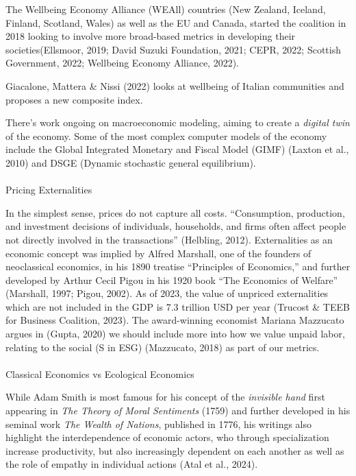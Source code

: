 \documentclass[
  letterpaper,
  DIV=11,
  numbers=noendperiod]{scrartcl}
\makeatletter
\let\oldparagraph\paragraph
\renewcommand{\paragraph}{
    \@ifstar
      \xxxParagraphStar
      \xxxParagraphNoStar
  }
\newcommand{\xxxParagraphStar}[1]{\oldparagraph*{#1}\mbox{}}
\newcommand{\xxxParagraphNoStar}[1]{\oldparagraph{#1}\mbox{}}
\makeatother
\begin{document}
The Wellbeing Economy Alliance (WEAll) countries (New Zealand, Iceland,
Finland, Scotland, Wales) as well as the EU and Canada, started the
coalition in 2018 looking to involve more broad-based metrics in
developing their societies(Ellsmoor, 2019; David Suzuki Foundation,
2021; CEPR, 2022; Scottish Government, 2022; Wellbeing Economy Alliance,
2022).

Giacalone, Mattera \& Nissi (2022) looks at wellbeing of Italian
communities and proposes a new composite index.

There's work ongoing on macroeconomic modeling, aiming to create a
\emph{digital twin} of the economy. Some of the most complex computer
models of the economy include the Global Integrated Monetary and Fiscal
Model (GIMF) (Laxton et al., 2010) and DSGE (Dynamic stochastic general
equilibrium).

\paragraph{Pricing Externalities}\label{pricing-externalities}

In the simplest sense, prices do not capture all costs. ``Consumption,
production, and investment decisions of individuals, households, and
firms often affect people not directly involved in the transactions''
(Helbling, 2012). Externalities as an economic concept was implied by
Alfred Marshall, one of the founders of neoclassical economics, in his
1890 treatise ``Principles of Economics,'' and further developed by
Arthur Cecil Pigou in his 1920 book ``The Economics of Welfare''
(Marshall, 1997; Pigou, 2002). As of 2023, the value of unpriced
externalities which are not included in the GDP is 7.3 trillion USD per
year (Trucost \& TEEB for Business Coalition, 2023). The award-winning
economist Mariana Mazzucato argues in (Gupta, 2020) we should include
more into how we value unpaid labor, relating to the social (S in ESG)
(Mazzucato, 2018) as part of our metrics.

\paragraph{Classical Economics vs Ecological
Economics}\label{classical-economics-vs-ecological-economics}

While Adam Smith is most famous for his concept of the \emph{invisible
hand} first appearing in \emph{The Theory of Moral Sentiments} (1759)
and further developed in his seminal work \emph{The Wealth of Nations},
published in 1776, his writings also highlight the interdependence of
economic actors, who through specialization increase productivity, but
also increasingly dependent on each another as well as the role of
empathy in individual actions (Atal et al., 2024).
\end{document}
